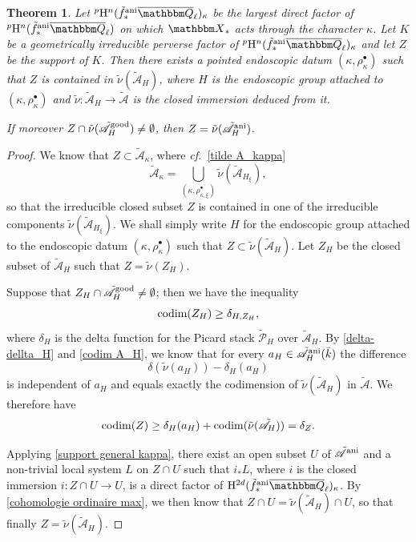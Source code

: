 \documentclass[12pt,english]{smfart}
\numberwithin{equation}{subsection}
\newtheorem{theoreme}[equation]{Theorem}
\theoremstyle{remark}
\newcommand\calA{{\mathscr A}}
\newcommand\calP{{\mathscr P}}
\newcommand\QQ{{\mathbbm Q}}
\newcommand\rmH{{\rm H}}
\newcommand\bbX{{\mathbbm X}}
\newcommand\cf{{\it cf.\ }}
\newcommand\ani{{\rm ani}}
\newcommand\Ql{{\overline\QQ_\ell}}
\begin{document}
\begin{theoreme}\label{support faible}
Let ${}^p\rmH^n(\tilde f^\ani_*\Ql)_\kappa$ be the largest direct factor of ${}^p\rmH^n(\tilde f^\ani_*\Ql)$ on which $\bbX_*$ acts through the character $\kappa$. Let $K$ be a geometrically irreducible perverse factor of ${}^p\rmH^n(\tilde f^\ani_*\Ql)_\kappa$ and let $Z$ be the support of $K$. Then there exists a pointed endoscopic datum $(\kappa,\rho_\kappa^\bullet)$ such that $Z$ is contained in $\tilde\nu(\tilde\calA_H)$, where $H$ is the endoscopic group attached to $(\kappa,\rho_\kappa^\bullet)$ and $\tilde\nu:\tilde\calA_H\rightarrow\tilde\calA$ is the closed immersion deduced from it.

If moreover $Z\cap\tilde\nu(\tilde\calA_H^{\rm good})\not=\emptyset$, then $Z=\tilde\nu(\tilde\calA_H^\ani)$.
\end{theoreme}

\begin{proof}
We know that $Z\subset\tilde\calA_\kappa$, where \cf \ref{tilde A_kappa}
$$\tilde\calA_\kappa=\bigcup_{(\kappa,\rho^\bullet_{\kappa,\xi})}\tilde\nu(\tilde\calA_{H_\xi}),$$
so that the irreducible closed subset $Z$ is contained in one of the irreducible components $\tilde\nu(\tilde\calA_{H_\xi})$. We shall simply write $H$ for the endoscopic group attached to the endoscopic datum $(\kappa,\rho_\kappa^\bullet)$ such that $Z\subset\tilde\nu(\tilde\calA_H)$. Let $Z_H$ be the closed subset of $\tilde\calA_H$ such that $Z=\tilde\nu(Z_H)$.

Suppose that $Z_H\cap\tilde\calA_H^{\rm good}\not=\emptyset$; then we have the inequality
$${\rm codim}(Z_H)\geq \delta_{H,Z_H},$$
where $\delta_H$ is the delta function for the Picard stack $\tilde\calP_H$ over $\tilde\calA_H$. By \ref{delta-dellta_H} and \ref{codim A_H}, we know that for every $a_H\in\tilde\calA_H^\ani(\bar k)$ the difference
$$\delta(\tilde\nu(a_H))-\delta_H(a_H)$$
is independent of $a_H$ and equals exactly the codimension of $\tilde\nu(\tilde\calA_H)$ in $\tilde\calA$. We therefore have
$${\rm codim}(Z)\geq \delta_H(a_H)+{\rm codim}(\tilde\nu(\tilde\calA_H))=\delta_Z.$$

Applying \ref{support general kappa}, there exist an open subset $U$ of $\tilde\calA^\ani$ and a non-trivial local system $L$ on $Z\cap U$ such that $i_*L$, where $i$ is the closed immersion $i:Z\cap U\rightarrow U$, is a direct factor of $\rmH^{2d}(\tilde f^\ani_*\Ql)_\kappa$. By \ref{cohomologie ordinaire max}, we then know that $Z\cap U=\tilde\nu(\tilde\calA_H)\cap U$, so that finally $Z=\tilde\nu(\tilde\calA_H)$.
\end{proof}
\end{document}
